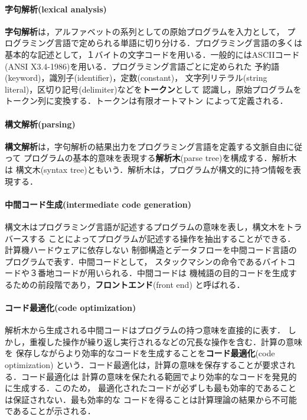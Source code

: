 \documentclass[dvipdfmx,a4j]{jbook}
\begin{document}
\paragraph{{\bf 字句解析}(lexical analysis)}
{\bf 字句解析}は，アルファベットの系列としての原始プログラムを入力として，
プログラミング言語で定められる単語に切り分ける．プログラミング言語の多くは
基本的な記述として，１バイトの文字コードを用いる．一般的にはASCIIコード
(ANSI X3.4-1986)を用いる．プログラミング言語ごとに定められた
予約語(keyword)，識別子(identifier)，定数(constant)，
文字列リテラル(string literal)，区切り記号(delimiter)などを{\bf トークン}として
認識し，原始プログラムをトークン列に変換する．トークンは有限オートマトン
によって定義される．

\paragraph{{\bf 構文解析}(parsing)}
{\bf 構文解析}は，字句解析の結果出力をプログラミング言語を定義する文脈自由に従って
プログラムの基本的意味を表現する{\bf 解析木}(parse tree)を構成する．解析木は
構文木(syntax tree)ともいう．解析木は，プログラムが構文的に持つ情報を表現する．

\paragraph{{\bf 中間コード生成}(intermediate code generation)}
構文木はプログラミング言語が記述するプログラムの意味を表し，構文木をトラバースする
ことによってプログラムが記述する操作を抽出することができる．計算機ハードウェアに依存しない
制御構造とデータフローを中間コード言語のプログラムで表す．中間コードとして，
スタックマシンの命令であるバイトコードや３番地コードが用いられる．中間コードは
機械語の目的コードを生成するための前段階であり，{\bf フロントエンド}(front end)
と呼ばれる．
  
\paragraph{{\bf コード最適化}(code optimization)}
解析木から生成される中間コードはプログラムの持つ意味を直接的に表す．
しかし，重複した操作が繰り返し実行されるなどの冗長な操作を含む．計算の意味を
保存しながらより効率的なコードを生成することを{\bf コード最適化}(code optimization)
という．コード最適化は，計算の意味を保存することが要求される．コード最適化は
計算の意味を保たれる範囲でより効率的なコードを発見的に生成する．このため，
最適化されたコードが必ずしも最も効率的であることは保証されない．最も効率的な
コードを得ることは計算理論の結果から不可能であることが示される．
  
\end{document}
